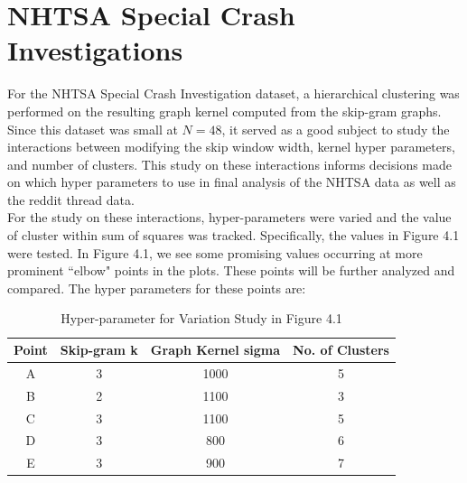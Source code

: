 %
%
%




\section{NHTSA Special Crash Investigations}
\hspace*{0.3cm} For the NHTSA Special Crash Investigation dataset, a hierarchical clustering was performed on the resulting graph kernel computed from the skip-gram graphs. Since this dataset was small at $N=48$, it served as a good subject to study the interactions between modifying the skip window width, kernel hyper parameters, and number of clusters. This study on these interactions informs decisions made on which hyper parameters to use in final analysis of the NHTSA data as well as the reddit thread data. \\
 
For the study on these interactions, hyper-parameters were varied and the value of cluster within sum of squares was tracked. Specifically, the values in Figure 4.1 were tested. In Figure 4.1, we see some promising values occurring at more prominent ``elbow" points in the plots. These points will be further analyzed and compared. The hyper parameters for these points are:\\
 
 \begin{table}
\centering
\begin{tabular}{c|c|c|c}
Point&Skip-gram k& Graph Kernel sigma&No. of Clusters \\
\hline
A&3&1000&5\\
B&2&1100&3\\
C&3&1100&5\\
D&3&800&6\\
E&3&900&7
\end{tabular}
\caption{Hyper-parameter for Variation Study in Figure 4.1}
\end{table}
 

